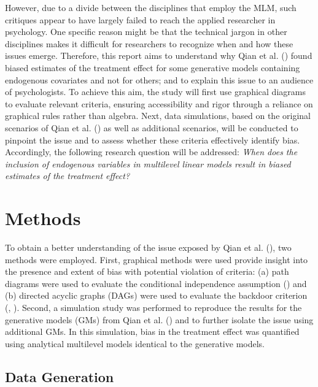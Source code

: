 \documentclass[
  11pt,
  a4paper,
]{article}
\begin{document}
However, due to a divide between the disciplines that employ the MLM,
such critiques appear to have largely failed to reach the applied
researcher in psychology. One specific reason might be that the
technical jargon in other disciplines makes it difficult for researchers
to recognize when and how these issues emerge. Therefore, this report
aims to understand why Qian et al. () found
biased estimates of the treatment effect for some generative models
containing endogenous covariates and not for others; and to explain this
issue to an audience of psychologists. To achieve this aim, the study
will first use graphical diagrams to evaluate relevant criteria,
ensuring accessibility and rigor through a reliance on graphical rules
rather than algebra. Next, data simulations, based on the original
scenarios of Qian et al. () as well as
additional scenarios, will be conducted to pinpoint the issue and to
assess whether these criteria effectively identify bias. Accordingly,
the following research question will be addressed: \emph{When does the
inclusion of endogenous variables in multilevel linear models result in
biased estimates of the treatment effect?}

\section{Methods}\label{methods}

To obtain a better understanding of the issue exposed by Qian et al.
(), two methods were employed. First,
graphical methods were used provide insight into the presence and extent
of bias with potential violation of criteria: (a) path diagrams were
used to evaluate the conditional independence assumption
() and (b) directed acyclic
graphs (DAGs) were used to evaluate the backdoor criterion
(, ).
Second, a simulation study was performed to reproduce the results for
the generative models (GMs) from Qian et al.
() and to further isolate the issue using
additional GMs. In this simulation, bias in the treatment effect was
quantified using analytical multilevel models identical to the
generative models.

\subsection{Data Generation}\label{data-generation}
\end{document}
